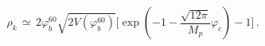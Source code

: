 \begin{equation}\label{rhok2}
\rho_{k} \, \simeq \, 2\varphi_{b}^{60}\sqrt{2V(\varphi_{b}^{60})} 
\Biggr[\exp(-1 - \frac{\sqrt{12 \pi}}{M_{p}}\varphi_{c})
- 1\Biggr] \, .
\end{equation}

